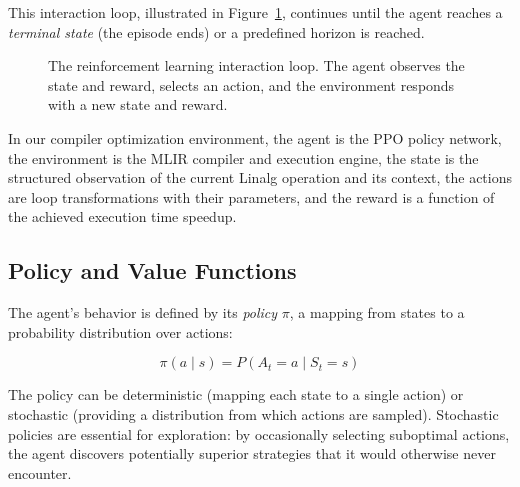 This interaction loop, illustrated in Figure~\ref{fig:rl-loop}, continues until the agent reaches a \textit{terminal state} (the episode ends) or a predefined horizon is reached.

\begin{figure}[H]
    \centering
    \caption{The reinforcement learning interaction loop. The agent observes the state and reward, selects an action, and the environment responds with a new state and reward.}
    \label{fig:rl-loop}
\end{figure}

In our compiler optimization environment, the agent is the PPO policy network, the environment is the MLIR compiler and execution engine, the state is the structured observation of the current Linalg operation and its context, the actions are loop transformations with their parameters, and the reward is a function of the achieved execution time speedup.

\subsection{Policy and Value Functions}

The agent's behavior is defined by its \textit{policy} $\pi$, a mapping from states to a probability distribution over actions:

\begin{equation}
    \pi(a \mid s) = P(A_t = a \mid S_t = s)
\end{equation}

The policy can be deterministic (mapping each state to a single action) or stochastic (providing a distribution from which actions are sampled). Stochastic policies are essential for exploration: by occasionally selecting suboptimal actions, the agent discovers potentially superior strategies that it would otherwise never encounter.

